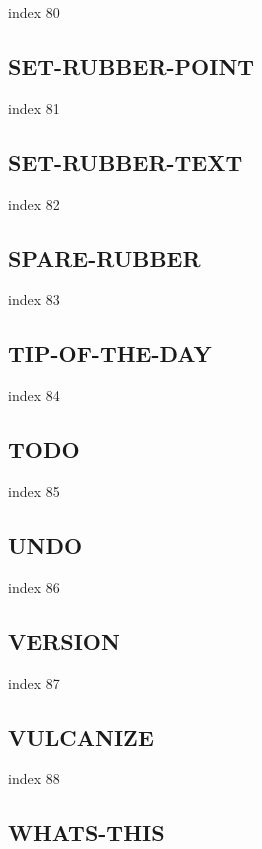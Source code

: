 \documentclass[a4paper]{report}
\begin{document}
{{{{{{{{{{{{{index 80

\subsection{SET-RUBBER-POINT}

index 81

\subsection{SET-RUBBER-TEXT}

index 82

\subsection{SPARE-RUBBER}

index 83

\subsection{TIP-OF-THE-DAY}

index 84

\subsection{TODO}

 index 85

\subsection{UNDO}

 index 86

\subsection{VERSION}

index 87

\subsection{VULCANIZE}

index 88

\subsection{WHATS-THIS}

}}}}}}}}}}}}}
\end{document}
